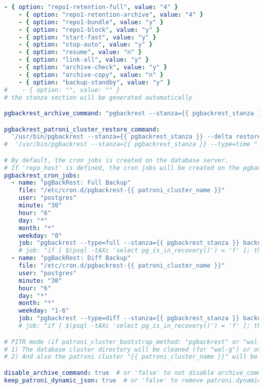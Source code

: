 \begin{flushleft}
\begin{lstlisting}[language=yaml, caption=Testsystem - Anhang - Maintenance - main.yml,captionpos=b,label={lst:testsystem-maintenance-main.yml},breaklines=true]
    - { option: "repo1-retention-full", value: "4" }
    - { option: "repo1-retention-archive", value: "4" }
    - { option: "repo1-bundle", value: "y" }
    - { option: "repo1-block", value: "y" }
    - { option: "start-fast", value: "y" }
    - { option: "stop-auto", value: "y" }
    - { option: "resume", value: "n" }
    - { option: "link-all", value: "y" }
    - { option: "archive-check", value: "y" }
    - { option: "archive-copy", value: "n" }
    - { option: "backup-standby", value: "y" }
#    - { option: "", value: "" }
# the stanza section will be generated automatically

pgbackrest_archive_command: "pgbackrest --stanza={{ pgbackrest_stanza }} archive-push %p"

pgbackrest_patroni_cluster_restore_command:
  '/usr/bin/pgbackrest --stanza={{ pgbackrest_stanza }} --delta restore'  # restore from latest backup
#  '/usr/bin/pgbackrest --stanza={{ pgbackrest_stanza }} --type=time "--target=2020-06-01 11:00:00+03" --delta restore'  # Point-in-Time Recovery (example)

# By default, the cron jobs is created on the database server.
# If 'repo_host' is defined, the cron jobs will be created on the pgbackrest server.
pgbackrest_cron_jobs:
  - name: "pgBackRest: Full Backup"
    file: "/etc/cron.d/pgbackrest-{{ patroni_cluster_name }}"
    user: "postgres"
    minute: "30"
    hour: "6"
    day: "*"
    month: "*"
    weekday: "0"
    job: "pgbackrest --type=full --stanza={{ pgbackrest_stanza }} backup"
    # job: "if [ $(psql -tAXc 'select pg_is_in_recovery()') = 'f' ]; then pgbackrest --type=full --stanza={{ pgbackrest_stanza }} backup; fi"
  - name: "pgBackRest: Diff Backup"
    file: "/etc/cron.d/pgbackrest-{{ patroni_cluster_name }}"
    user: "postgres"
    minute: "30"
    hour: "6"
    day: "*"
    month: "*"
    weekday: "1-6"
    job: "pgbackrest --type=diff --stanza={{ pgbackrest_stanza }} backup"
    # job: "if [ $(psql -tAXc 'select pg_is_in_recovery()') = 'f' ]; then pgbackrest --type=diff --stanza={{ pgbackrest_stanza }} backup; fi"

# PITR mode (if patroni_cluster_bootstrap_method: "pgbackrest" or "wal-g"):
# 1) The database cluster directory will be cleaned (for "wal-g") or overwritten (for "pgbackrest" --delta restore).
# 2) And also the patroni cluster "{{ patroni_cluster_name }}" will be removed from the DCS (if exist) before recovery.

disable_archive_command: true  # or 'false' to not disable archive_command after restore
keep_patroni_dynamic_json: true  # or 'false' to remove patroni.dynamic.json after restore (if exists)



\end{lstlisting}
\end{flushleft}
